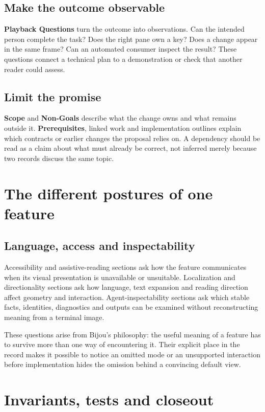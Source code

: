 \subsection*{Make the outcome observable}

\textbf{Playback Questions} turn the outcome into observations. Can the intended person complete the task? Does the right pane own a key? Does a change appear in the same frame? Can an automated consumer inspect the result? These questions connect a technical plan to a demonstration or check that another reader could assess.

\subsection*{Limit the promise}

\textbf{Scope} and \textbf{Non-Goals} describe what the change owns and what remains outside it. \textbf{Prerequisites}, linked work and implementation outlines explain which contracts or earlier changes the proposal relies on. A dependency should be read as a claim about what must already be correct, not inferred merely because two records discuss the same topic.

\section*{The different postures of one feature}

\subsection*{Language, access and inspectability}

Accessibility and assistive-reading sections ask how the feature communicates when its visual presentation is unavailable or unsuitable. Localization and directionality sections ask how language, text expansion and reading direction affect geometry and interaction. Agent-inspectability sections ask which stable facts, identities, diagnostics and outputs can be examined without reconstructing meaning from a terminal image.

These questions arise from Bijou's philosophy: the useful meaning of a feature has to survive more than one way of encountering it. Their explicit place in the record makes it possible to notice an omitted mode or an unsupported interaction before implementation hides the omission behind a convincing default view.

\section*{Invariants, tests and closeout}

